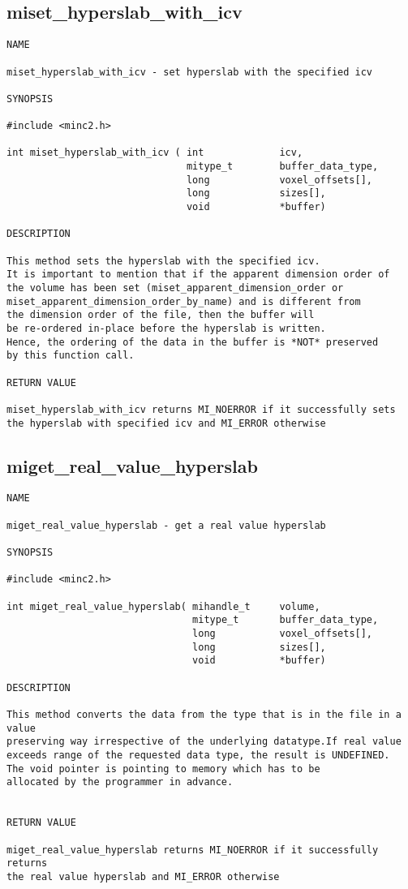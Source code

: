 \documentclass{article}
\begin{document}
\subsection{miset\_hyperslab\_with\_icv}
\begin{verbatim}
NAME

miset_hyperslab_with_icv - set hyperslab with the specified icv

SYNOPSIS

#include <minc2.h>

int miset_hyperslab_with_icv ( int             icv,
                               mitype_t        buffer_data_type,
                               long            voxel_offsets[],
                               long            sizes[],
                               void            *buffer)                
                                        
DESCRIPTION

This method sets the hyperslab with the specified icv.
It is important to mention that if the apparent dimension order of 
the volume has been set (miset_apparent_dimension_order or 
miset_apparent_dimension_order_by_name) and is different from 
the dimension order of the file, then the buffer will
be re-ordered in-place before the hyperslab is written.  
Hence, the ordering of the data in the buffer is *NOT* preserved 
by this function call.

RETURN VALUE

miset_hyperslab_with_icv returns MI_NOERROR if it successfully sets
the hyperslab with specified icv and MI_ERROR otherwise
\end{verbatim}

\subsection{miget\_real\_value\_hyperslab}
\begin{verbatim}
NAME

miget_real_value_hyperslab - get a real value hyperslab

SYNOPSIS

#include <minc2.h>

int miget_real_value_hyperslab( mihandle_t     volume,
                                mitype_t       buffer_data_type,
                                long           voxel_offsets[],
                                long           sizes[],
                                void           *buffer)

DESCRIPTION

This method converts the data from the type that is in the file in a value
preserving way irrespective of the underlying datatype.If real value 
exceeds range of the requested data type, the result is UNDEFINED. 
The void pointer is pointing to memory which has to be 
allocated by the programmer in advance.


RETURN VALUE

miget_real_value_hyperslab returns MI_NOERROR if it successfully returns
the real value hyperslab and MI_ERROR otherwise
\end{verbatim}
\end{document}
